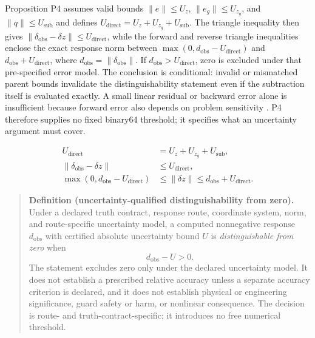 \documentclass[preprint,12pt]{elsarticle}
\begin{document}
Proposition P4 assumes valid bounds $\lVert e \rVert\leq U_z$, $\lVert e_g \rVert\leq U_{z_g}$, and $\lVert q \rVert\leq U_{\mathrm{sub}}$ and defines $U_{\mathrm{direct}}=U_z+U_{z_g}+U_{\mathrm{sub}}$. The triangle inequality then gives $\lVert \delta_{\mathrm{obs}}-\delta z \rVert\leq U_{\mathrm{direct}}$, while the forward and reverse triangle inequalities enclose the exact response norm between $\max(0,d_{\mathrm{obs}}-U_{\mathrm{direct}})$ and $d_{\mathrm{obs}}+U_{\mathrm{direct}}$, where $d_{\mathrm{obs}}=\lVert \delta_{\mathrm{obs}} \rVert$. If $d_{\mathrm{obs}}>U_{\mathrm{direct}}$, zero is excluded under that pre-specified error model. The conclusion is conditional: invalid or mismatched parent bounds invalidate the distinguishability statement even if the subtraction itself is evaluated exactly. A small linear residual or backward error alone is insufficient because forward error also depends on problem sensitivity \cite{S03,S11}. P4 therefore supplies no fixed binary64 threshold; it specifies what an uncertainty argument must cover.

\begin{linenomath*}
\begin{equation}
\begin{aligned}
U_{\mathrm{direct}}&=U_z+U_{z_g}+U_{\mathrm{sub}},\\
\lVert\delta_{\mathrm{obs}}-\delta z\rVert&\leq U_{\mathrm{direct}},\\
\max(0,d_{\mathrm{obs}}-U_{\mathrm{direct}})
&\leq\lVert\delta z\rVert\leq d_{\mathrm{obs}}+U_{\mathrm{direct}}.
\end{aligned}
\label{eq:direct_difference_enclosure}
\end{equation}
\end{linenomath*}

\begin{quote}
\textbf{Definition (uncertainty-qualified distinguishability from zero).}
Under a declared truth contract, response route, coordinate system, norm, and route-specific uncertainty model, a computed nonnegative response $d_{\mathrm{obs}}$ with certified absolute uncertainty bound $U$ is \emph{distinguishable from zero} when
\begin{equation}
d_{\mathrm{obs}}-U>0.
\label{eq:distinguishable_definition}
\end{equation}
The statement excludes zero only under the declared uncertainty model. It does not establish a prescribed relative accuracy unless a separate accuracy criterion is declared, and it does not establish physical or engineering significance, guard safety or harm, or nonlinear consequence. The decision is route- and truth-contract-specific; it introduces no free numerical threshold.
\end{quote}
\end{document}
